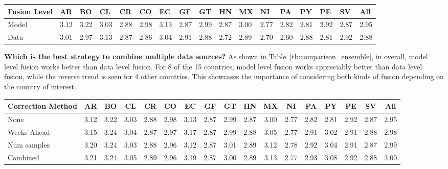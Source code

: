 \begin{table*}[H]
  \scriptsize
  \centering
\captionsetup{font=scriptsize}
  \caption{\label{tb:comparison_ensemble}Comparison of prediction accuracy while combining all data sources
  and using MFN regression.}
\vspace{-1em}
  \begin{tabular}{|p{1.5cm}|*{16}{l|}}
\hline
Fusion Level& AR & BO & CL & CR & CO & EC & GF & GT & HN & MX & NI & PA & PY & PE & SV & All\\
\hline \hline
Model       &3.12&3.22&3.03&2.88&2.98&3.13&2.87&2.99&2.87&3.00&2.77&2.82&2.81&2.92&2.87&2.95\\ 
Data        &3.01&2.97&3.13&2.87&2.86&3.04&2.91&2.88&2.72&2.89&2.70&2.60&2.88&2.81&2.92&2.88\\ 
\hline
\end{tabular}
\end{table*}

{\noindent \textbf{Which is the best strategy to combine
multiple data sources?}} 
As shown in Table~\ref{tb:comparison_ensemble}, in overall,
model level fusion works better than data level fusion.
For 8 of the 15 countries, model level fusion works
appreciably better than data level fusion, while the reverse trend is seen for 4 other countries. 
This showcases the importance of considering both kinds of fusion depending on the country of interest.

\begin{table*}[H]
  \scriptsize
  \centering
\captionsetup{font=scriptsize}
  \caption{\label{tb:moving} Comparison of prediction accuracy while using model level fusion 
  on MFN regressors and employing PAHO stabilization.}
\vspace{-1em}
\begin{tabular}{|p{1.5cm}|*{16}{c|}}
\hline
Correction Method& AR & BO & CL & CR & CO & EC & GF & GT & HN & MX & NI & PA & PY & PE & SV & All\\
\hline \hline
None             &3.12&3.22&3.03&2.88&2.98&3.13&2.87&2.99&2.87&3.00&2.77&2.82&2.81&2.92&2.87&2.95\\ \hline
Weeks Ahead      &3.15&3.24&3.04&2.87&2.97&3.17&2.87&2.99&2.88&3.05&2.77&2.91&3.02&2.91&2.88&2.98\\ \hline 
Num samples      &3.20&3.24&3.03&2.88&2.96&3.12&2.87&3.01&2.89&3.12&2.78&2.92&3.04&2.91&2.87&2.99\\ \hline
Combined         &3.21&3.24&3.05&2.89&2.96&3.19&2.87&3.00&2.89&3.13&2.77&2.93&3.08&2.92&2.88&3.00\\ 
\hline
\end{tabular}
\end{table*}


